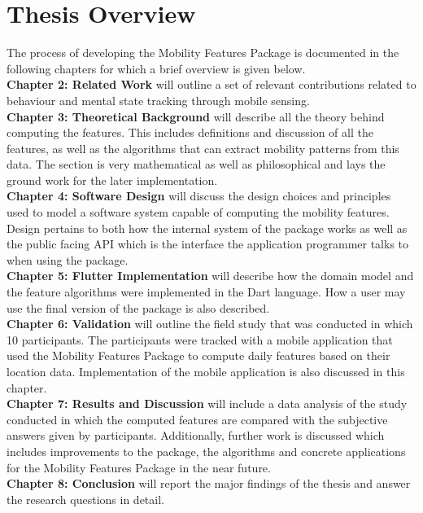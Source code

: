 \section{Thesis Overview}

The process of developing the Mobility Features Package is documented in the following chapters for which a brief overview is given below.\\

\textbf{Chapter 2: Related Work} will outline a set of relevant contributions related to behaviour and mental state tracking through mobile sensing. \\

\textbf{Chapter 3: Theoretical Background} will describe all the theory behind computing the features. This includes definitions and discussion of all the features, as well as the algorithms that can extract mobility patterns from this data. The section is very mathematical as well as philosophical and lays the ground work for the later implementation.\\

\textbf{Chapter 4: Software Design} will discuss the design choices and principles used to model a software system capable of computing the mobility features. Design pertains to both how the internal system of the package works as well as the public facing API which is the interface the application programmer talks to when using the package.\\

\textbf{Chapter 5: Flutter Implementation} will describe how the domain model and the feature algorithms were implemented in the Dart language. How a user may use the final version of the package is also described.\\

\textbf{Chapter 6: Validation} will outline the field study that was conducted in which 10 participants. The participants were tracked with a mobile application that used the Mobility Features Package to compute daily features based on their location data. Implementation of the mobile application is also discussed in this chapter.\\

\textbf{Chapter 7: Results and Discussion} will include a data analysis of the study conducted in which the computed features are compared with the subjective answers given by participants. Additionally, further work is discussed which includes improvements to the package, the algorithms and concrete applications for the Mobility Features Package in the near future.\\

\textbf{Chapter 8: Conclusion} will report the major findings of the thesis and answer the research questions in detail.\\